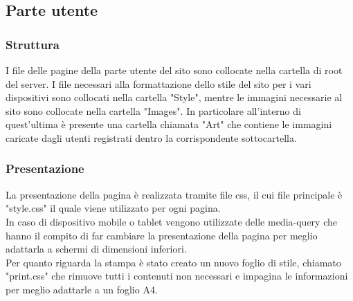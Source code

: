 \documentclass[openany, a4paper, 12pt]{report}
\begin{document}
		\subsection{Parte utente}
			\subsubsection{Struttura}
			I file delle pagine della parte utente del sito sono collocate nella cartella di root del server. I file necessari alla formattazione dello stile del sito per i vari dispositivi sono collocati nella cartella "Style", mentre le immagini necessarie al sito sono collocate nella cartella "Images". In particolare all'interno di quest'ultima è presente una cartella chiamata "Art" che contiene le immagini caricate dagli utenti registrati dentro la corrispondente sottocartella.
			\subsubsection{Presentazione}
			La presentazione della pagina è realizzata tramite file css, il cui file principale è "style.css" il quale viene utilizzato per ogni pagina.\\
			In caso di dispositivo mobile o tablet vengono utilizzate delle media-query che hanno il compito di far cambiare la presentazione della pagina per meglio adattarla a schermi di dimensioni inferiori.\\
			Per quanto riguarda la stampa è stato creato un nuovo foglio di stile, chiamato "print.css" che rimuove tutti i contenuti non necessari e impagina le informazioni per meglio adattarle a un foglio A4. 
		
\end{document}
